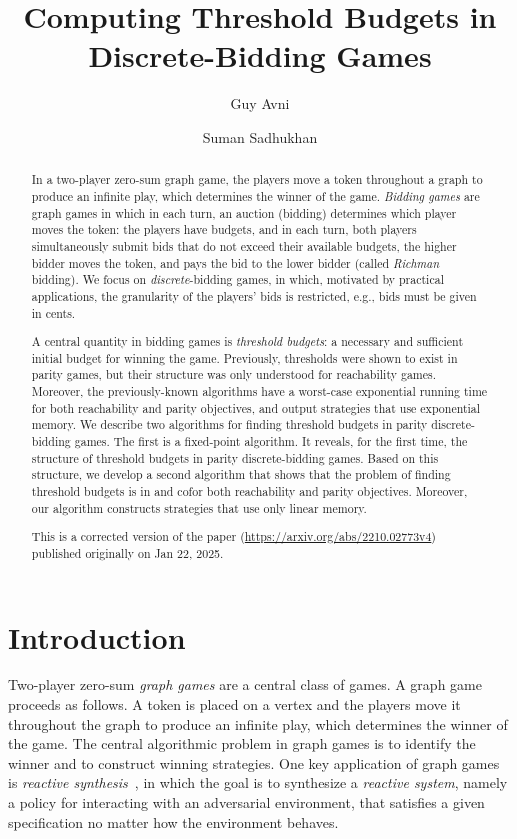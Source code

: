 \documentclass{article}\providecommand{\nequiv}{\not\equiv}\usepackage[a4paper,margin=20mm]{geometry}
\title{Computing Threshold Budgets in Discrete-Bidding Games}
\author{Guy Avni \and Suman Sadhukhan}\date{}
\begin{document}
\maketitle

\begin{abstract}
In a two-player zero-sum graph game, the players move a token throughout a graph to produce an infinite play, which determines the winner of the game. \emph{Bidding games} are graph games in which in each turn, an auction (bidding) determines which player moves the token: the players have budgets, and in each turn, both players simultaneously submit bids that do not exceed their available budgets, the higher bidder moves the token, and pays the bid to the lower bidder (called {\em Richman} bidding). We focus on {\em discrete}-bidding games, in which, motivated by practical applications, the granularity of the players' bids is restricted, e.g., bids must be given in cents. 

A central quantity in bidding games is {\em threshold budgets}:  a necessary and sufficient initial budget for winning the game. Previously, thresholds were shown to exist in parity games, but their structure was only understood for reachability games. Moreover, the previously-known algorithms have a worst-case exponential running time for both reachability and parity objectives, and output strategies that use exponential memory. 
We describe two algorithms for finding threshold budgets in parity discrete-bidding games. The first is a fixed-point algorithm. 
It reveals, for the first time, the structure of threshold budgets in parity discrete-bidding games. 
Based on this structure, we develop a second algorithm that shows that the problem of finding threshold budgets is in \NP and co\NP for both reachability and parity objectives. Moreover, our algorithm constructs strategies that use only linear memory.

This is a corrected version of the paper (\url{https://arxiv.org/abs/2210.02773v4}) published originally on Jan 22, 2025.
\end{abstract}

%
\section{Introduction}
Two-player zero-sum {\em graph games} are a central class of games. A graph game proceeds as follows. A token is placed on a vertex and the players move it throughout the graph to produce an infinite play, which determines the winner of the game. The central algorithmic problem in graph games is to identify the winner and to construct winning strategies. One key application of graph games is {\em reactive synthesis}~\cite{PR89}, in which the goal is to synthesize a {\em reactive system}, namely a policy for interacting with an adversarial environment,  that satisfies a given specification no matter how the environment behaves. %
\end{document}
